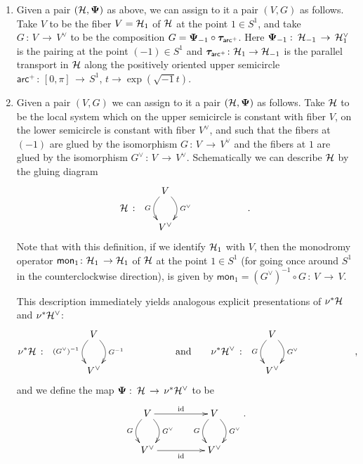 \documentclass[twoside,leqno]{article}
\numberwithin{equation}{section}
\theoremstyle{plain}
\theoremstyle{definition}
\begin{document}
\begin{enumerate}[wide]
    \item  Given a pair 
$(\mathcal H,\boldsymbol{\Psi})$ as above, we can assign to it a pair $(V,G)$ as follows. Take  $V$ to be the fiber $V = \mathcal H_{1}$ of $\mathcal H$ at the point $1 \in S^1$, and take $G \, \colon \, V \, \to \, V^{\vee}$ to be the composition $G = \boldsymbol{\Psi}_{-1}\circ \boldsymbol{\tau}_{\mathsf{arc}^{+}}$. Here $\boldsymbol{\Psi}_{-1} \, \colon \, \mathcal H_{-1} \, \to \, \mathcal H_{1}^{\vee}$ is the pairing at the point $(-1) \in S^1$ and $\boldsymbol{\tau}_{\mathsf{arc}^{+}}  \colon \mathcal H_{1} \to \mathcal H_{-1}$ is the parallel transport in $\mathcal H$ along the positively oriented 
upper semicircle $\mathsf{arc}^{+} \, \colon  \, [0,\pi] \, \to \, S^1$, $t \to \exp(\sqrt{-1}t)$.  
 \item Given a pair  $(V,G)$ we can assign to it a pair $(\mathcal H,\boldsymbol{\Psi})$ as follows. Take $\mathcal H$ to be the local system which on the upper semicircle is constant with fiber $V$, on the lower semicircle is constant with fiber $V^{\vee}$, and such that the fibers at $(-1)$ are glued by the isomorphism $G \, \colon \,  V \, \to \, V^{\vee}$ and the fibers at $1$ are glued by the isomorphism $G^{\vee} \, \colon \, V \, \to \, V^{\vee}$. Schematically we can describe $\mathcal H$ by the gluing diagram
 \[
 \cH \ \colon \ \text{\begin{minipage}[c]{1.5in} $\xymatrix{ V \ar@/_1pc/[d]_-{G} \ar@/^1pc/[d]^-{G^{\vee}} \\ V^{\vee}}$\end{minipage}}.
 \]
 Note that with this definition, if we identify $\mathcal H_{1}$ with $V$, then the monodromy operator $\mathsf{mon}_{1} \colon \mathcal H_{1} \, \to \mathcal H_{1}$ of $\mathcal H$ at the point $1 \in S^1$ (for going once around $S^1$ in the counterclockwise direction), is given by  $\mathsf{mon}_{1} = (G^{\vee})^{-1}\circ G \, \colon \, V \, \to \, V$.

This description immediately yields analogous explicit presentations of $\nu^{*}\mathcal H$ and $\nu^{*}\mathcal H^{\vee}$:
\[
\nu^{*}\cH \ \colon \ \text{\begin{minipage}[c]{1.5in} 
$\xymatrix{ V \ar@/_1pc/[d]_-{(G^{\vee})^{-1}} \ar@/^1pc/[d]^-{G^{-1}} \\ V^{\vee}}$\end{minipage}}
\qquad \text{and} \qquad 
\nu^{*}\cH^{\vee} \ \colon \ \text{\begin{minipage}[c]{1.5in} $\xymatrix{ V \ar@/_1pc/[d]_-{G} \ar@/^1pc/[d]^-{G^{\vee}} \\ V^{\vee}}$\end{minipage}},
\]
and we  define the map $\boldsymbol{\Psi} \, \colon \, \mathcal H \, \to \, \nu^{*}\mathcal H^{\vee}$ to be 
\[
\xymatrix@C+2pc{ V \ar@/_1pc/[d]_-{G} \ar@/^1pc/[d]^-{G^{\vee}} \ar[r]^-{\op{id}} & 
V \ar@/_1pc/[d]_-{G} \ar@/^1pc/[d]^-{G^{\vee}}  \\ 
V^{\vee} \ar[r]_-{\op{id}} & V^{\vee}}.
\]
\end{enumerate}
\end{document}
